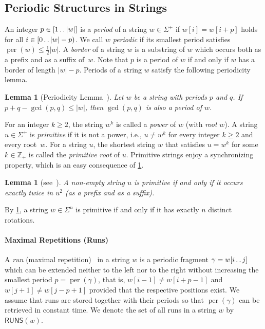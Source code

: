\documentclass[a4paper]{article}
\newtheorem{lemma}[theorem]{Lemma}
\theoremstyle{definition}
\theoremstyle{remark}
\newcommand{\dd}{\mathinner{\ldotp\ldotp}}
\DeclareMathOperator{\per}{per}
\newcommand{\RUNS}{\mathsf{RUNS}}
\begin{document}
\subsection{Periodic Structures in Strings}\label{sec:per_struct}
An integer $p\in [1\dd |w|]$ is a \emph{period} of a string $w\in \Sigma^+$ if $w[i]=w[i+p]$ holds for all $i\in  [0\dd |w|-p)$.
We call $w$ \emph{periodic} if its smallest period satisfies $\per(w)\le \tfrac12 |w|$.
A \emph{border} of a string $w$ is a substring of $w$ which occurs both as a prefix and as a suffix of~$w$.
Note that $p$ is a period of $w$ if and only if $w$ has a border of length $|w|-p$.
Periods of a string $w$ satisfy the following periodicity lemma.
\begin{lemma}[Periodicity Lemma~\cite{MR0162838,fine1965uniqueness}]\label{lem:per}
Let $w$ be a string with periods $p$ and $q$.
If $p+q-\gcd(p,q)\le |w|$, then $\gcd(p,q)$ is also a period of $w$.
\end{lemma}

For an integer $k\ge 2$, the string $w^k$ is called a \emph{power} of $w$ (with \emph{root} $w$).
A string $u\in \Sigma^+$ is \emph{primitive} if it is not a power,
i.e., $u\ne w^k$ for every integer $k\ge 2$ and every root~$w$.
For a string $u$, the shortest string $w$ that satisfies $u=w^k$ for some $k \in \mathbb{Z}_{+}$ is called the \emph{primitive root} of $u$.
Primitive strings enjoy a synchronizing property, which is an easy consequence of \cref{lem:per}.

\begin{lemma}[{see~\cite[{Lemma~1.11}]{AlgorithmsOnStrings}}]\label{lem:synchr}
A non-empty string $u$ is primitive if and only if it occurs exactly twice in $u^2$ (as a prefix and as a suffix).
\end{lemma}

By \cref{lem:synchr}, a string $w\in \Sigma^n$ is primitive if and only if it has exactly $n$ distinct rotations.


\paragraph{Maximal Repetitions (Runs)}\label{sec:runs}
A \emph{run} (maximal repetition)~\cite{DBLP:journals/dam/Main89,DBLP:conf/focs/KolpakovK99} in a string $w$ is a periodic fragment
$\gamma=w[i\dd j]$ which can be extended neither to the left nor to the right without increasing the smallest period $p=\per(\gamma)$,
that is, $w[i-1] \ne w[i+p-1]$ and $w[j+1] \ne w[j-p+1]$ provided that the respective positions exist.
We assume that runs are stored together with their periods so that $\per(\gamma)$ can be retrieved in constant time.
We denote the set of all runs in a string $w$ by $\RUNS(w)$.
\end{document}
